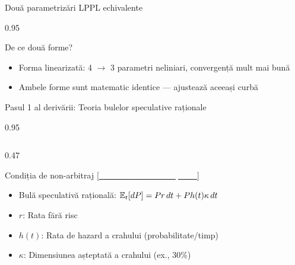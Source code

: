 \documentclass[9pt, aspectratio=169, t]{beamer}
\begin{document}
\begin{frame}{Două parametrizări LPPL echivalente}
\begin{cminipage}{0.95\textwidth}
{    \vspace{-1mm}
    \begin{exampleblock}{De ce două forme?}
        \begin{itemize}\setlength{\itemsep}{0pt}
            \item Forma linearizată: 4 $\to$ 3 parametri neliniari, convergență mult mai bună
            \item Ambele forme sunt matematic identice --- ajustează aceeași curbă
        \end{itemize}
    \end{exampleblock}
    }
    \end{cminipage}
\end{frame}

\begin{frame}{Pasul 1 al derivării: Teoria bulelor speculative raționale}
    \begin{cminipage}{0.95\textwidth}
    {\footnotesize
    \begin{columns}[T]
        \begin{column}{0.47\textwidth}
            \begin{block}{Condiția de non-arbitraj {\scriptsize[\href{https://doi.org/10.3386/w0945}{\textcolor{white}{Blanchard \& Watson, 1982}}]}}
                \begin{itemize}\setlength{\itemsep}{0pt}
                    \item Bulă speculativă rațională: $\mathbb{E}_t[dP] = P r\, dt + P h(t) \kappa\, dt$
                    \item $r$: Rata fără risc
                    \item $h(t)$: Rata de hazard a crahului (probabilitate/timp)
                    \item $\kappa$: Dimensiunea așteptată a crahului (ex., 30\%)
                \end{itemize}
            \end{block}


\end{column}
\end{columns}}
\end{cminipage}
\end{frame}
\end{document}
